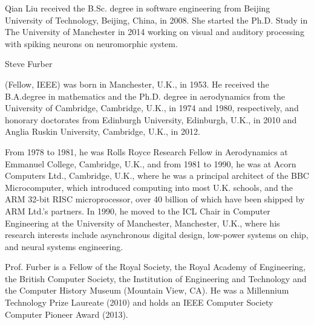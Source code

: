 \documentclass[journal]{journal}
\begin{document}
\begin{IEEEbiography}{Qian Liu}
received the B.Sc. degree in
software engineering from Beijing University of Technology, Beijing, China, in 2008.
She started the Ph.D. Study in The University of Manchester in 2014 working on visual and auditory processing with spiking neurons on neuromorphic system.
\end{IEEEbiography}
\begin{biography}{Steve Furber}

(Fellow, IEEE) was born in Manchester, U.K., in 1953. 
He received the B.A.degree in mathematics and the Ph.D. degree in aerodynamics from the University of Cambridge, Cambridge, U.K., in 1974 and 1980, respectively, and honorary doctorates from Edinburgh University, Edinburgh, U.K., in 2010 and Anglia Ruskin University, Cambridge, U.K., in 2012.

From 1978 to 1981, he was Rolls Royce Research Fellow in Aerodynamics at Emmanuel College, Cambridge, U.K., and from 1981 to 1990, he was at Acorn Computers Ltd., Cambridge, U.K., where he was a principal architect of the BBC Microcomputer, which introduced computing into most U.K. schools, and the ARM 32-bit RISC microprocessor, over 40 billion of which have been shipped by ARM Ltd.’s partners.
In 1990, he moved to the ICL Chair in Computer Engineering at the University of Manchester, Manchester, U.K., where his research interests include asynchronous
digital design, low-power systems on chip, and neural systems engineering.

Prof. Furber is a Fellow of the Royal Society, the Royal Academy of Engineering, the British Computer Society, the Institution of Engineering and Technology and the Computer History Museum (Mountain View, CA).
He was a Millennium Technology Prize Laureate (2010) and holds an IEEE Computer Society Computer Pioneer Award (2013).
\end{biography}
\end{document}
